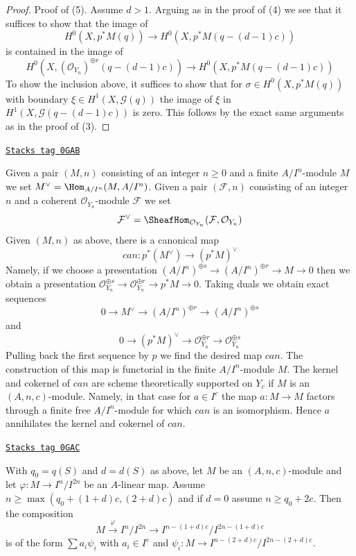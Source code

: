 \begin{proof}
\medskip\noindent
Proof of (5). Assume $d > 1$. Arguing as in the proof of (4) we see that
it suffices to show that the image of
$$
H^0(X, p^*M(q))
\longrightarrow
H^0(X, p^*M(q - (d - 1)c))
$$
is contained in the image of
$$
H^0(X, (\mathcal{O}_{Y_n})^{\oplus r}(q - (d - 1)c))
\longrightarrow
H^0(X, p^*M(q - (d - 1)c))
$$
To show the inclusion above, it suffices to show that for
$\sigma \in H^0(X, p^*M(q))$ with boundary
$\xi \in H^1(X, \mathcal{G}(q))$ the image of $\xi$ in
$H^1(X, \mathcal{G}(q - (d - 1)c))$ is zero. This follows by the
exact same arguments as in the proof of (3).
\end{proof}

\begin{remark}[Duals]
\label{local-cohomology-remark-duals}
\href{https://stacks.math.columbia.edu/tag/0GAB}{\texttt{Stacks tag 0GAB}}

Given a pair $(M, n)$ consisting of an integer $n \geq 0$
and a finite $A/I^n$-module $M$ we set $M^\vee = \Hom_{A/I^n}(M, A/I^n)$.
Given a pair $(\mathcal{F}, n)$ consisting of an integer $n$ and
a coherent $\mathcal{O}_{Y_n}$-module $\mathcal{F}$ we set
$$
\mathcal{F}^\vee =
\SheafHom_{\mathcal{O}_{Y_n}}(\mathcal{F}, \mathcal{O}_{Y_n})
$$
Given $(M, n)$ as above, there is a canonical map
$$
can : p^*(M^\vee) \longrightarrow (p^*M)^\vee
$$
Namely, if we choose a presentation
$(A/I^n)^{\oplus s} \to (A/I^n)^{\oplus r} \to M \to 0$
then we obtain a presentation
$\mathcal{O}_{Y_n}^{\oplus s} \to \mathcal{O}_{Y_n}^{\oplus r} \to
p^*M \to 0$. Taking duals we obtain exact sequences
$$
0 \to M^\vee \to (A/I^n)^{\oplus r} \to (A/I^n)^{\oplus s}
$$
and
$$
0 \to (p^*M)^\vee \to
\mathcal{O}_{Y_n}^{\oplus r} \to
\mathcal{O}_{Y_n}^{\oplus s}
$$
Pulling back the first sequence by $p$ we find the desired map $can$.
The construction of this map is functorial in the finite
$A/I^n$-module $M$. The kernel and cokernel of $can$
are scheme theoretically supported
on $Y_c$ if $M$ is an $(A, n, c)$-module. Namely, in that case for
$a \in I^c$ the map $a : M \to M$ factors through a finite free
$A/I^n$-module for which $can$ is an isomorphism. Hence $a$ annihilates
the kernel and cokernel of $can$.
\end{remark}

\begin{lemma}
\label{local-cohomology-lemma-factor-hom}
\href{https://stacks.math.columbia.edu/tag/0GAC}{\texttt{Stacks tag 0GAC}}

With $q_0 = q(S)$ and $d = d(S)$ as above, let $M$ be an $(A, n, c)$-module
and let $\varphi : M \to I^n/I^{2n}$ be an $A$-linear map. Assume
$n \geq \max(q_0 + (1 + d)c, (2 + d)c)$ and if $d = 0$ assume
$n \geq q_0 + 2c$. Then the composition
$$
M \xrightarrow{\varphi} I^n/I^{2n} \to
I^{n - (1 + d)c}/I^{2n - (1 + d)c}
$$
is of the form $\sum a_i \psi_i$ with $a_i \in I^c$ and
$\psi_i : M \to I^{n - (2 + d)c}/I^{2n - (2 + d)c}$.
\end{lemma}

